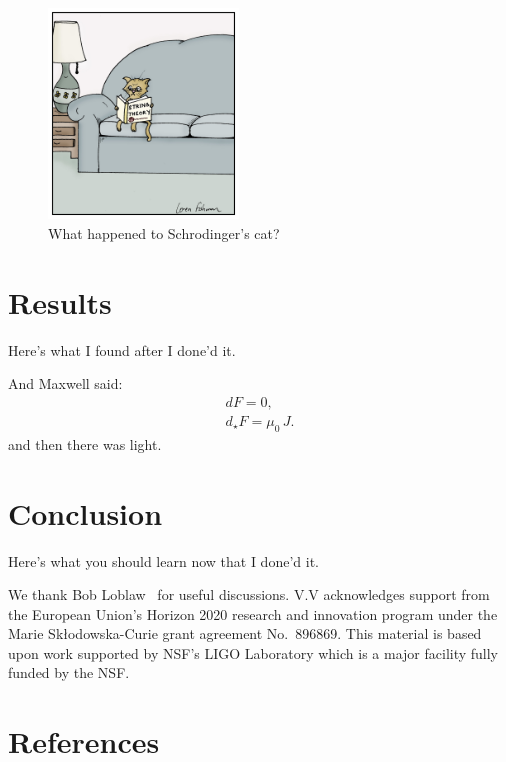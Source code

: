 \documentclass[aps,prd,amsmath,floats,floatfix, twocolumn,
superscriptaddress,nofootinbib,showpacs,longbibliography]{revtex4-1}
\begin{document}
\begin{figure}[thb]
\includegraphics[width=0.45\textwidth]{string_cat.jpeg}
\caption{
What happened to Schrodinger's cat?
}
\label{fig:strings}
\end{figure}

\section{Results}
\label{sec:results}
Here's what I found after I done'd it.

And Maxwell said:
\begin{gather}
    dF = 0, \\
    d_{\star}F = \mu_0 \, J.
\label{eq:doppler_mass}
\end{gather}
and then there was light.


\section{Conclusion}
\label{sec:conclusion}
Here's what you should learn now that I done'd it.


\begin{acknowledgments}
We thank Bob Loblaw~\cite{BobLoblaw} for useful discussions.
V.V acknowledges support from the European Union’s Horizon 2020 research and
innovation program under the Marie Skłodowska-Curie grant agreement No.~896869.
This material is based upon work supported by NSF's LIGO Laboratory which is a
major facility fully funded by the NSF.
\end{acknowledgments}

\section*{References}

\end{document}
